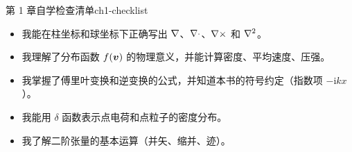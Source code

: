 \begin{checklistbox}{第 1 章自学检查清单}{ch1-checklist}
\begin{itemize}[leftmargin=*,label=$\square$]
\item 我能在柱坐标和球坐标下正确写出 $\nabla$、$\nabla\cdot$、$\nabla\times$ 和 $\nabla^2$。
\item 我理解了分布函数 $f(\bm{v})$ 的物理意义，并能计算密度、平均速度、压强。
\item 我掌握了傅里叶变换和逆变换的公式，并知道本书的符号约定（指数项 $-\mathrm{i}kx$）。
\item 我能用 $\delta$ 函数表示点电荷和点粒子的密度分布。
\item 我了解二阶张量的基本运算（并矢、缩并、迹）。
\end{itemize}
\end{checklistbox}


\endinput
